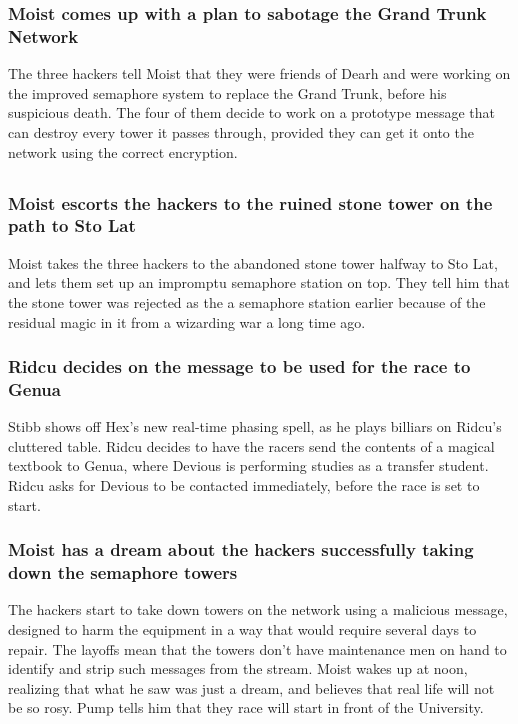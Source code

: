 \subsubsection{\Gls{Moist} comes up with a plan to sabotage the Grand Trunk Network}
The three hackers tell \Gls{Moist} that they were friends of \Gls{Dearh} and were working on the
improved semaphore system to replace the Grand Trunk, before his suspicious death. The four of them
decide to work on a prototype message that can destroy every tower it passes through, provided they
can get it onto the network using the correct encryption.

\subsection{}
\subsubsection{\Gls{Moist} escorts the hackers to the ruined stone tower on the path to Sto Lat}
\Gls{Moist} takes the three hackers to the abandoned stone tower halfway to Sto Lat, and lets them
set up an impromptu semaphore station on top. They tell him that the stone tower was rejected as
the a semaphore station earlier because of the residual magic in it from a wizarding war a long time
ago.

\subsubsection{\Gls{Ridcu} decides on the message to be used for the race to Genua}
\Gls{Stibb} shows off \Gls{Hex}'s new real-time phasing spell, as he plays billiars on \Gls{Ridcu}'s
cluttered table. \Gls{Ridcu} decides to have the racers send the contents of a magical textbook to
Genua, where \Gls{Devious} is performing studies as a transfer student. \Gls{Ridcu} asks for
\Gls{Devious} to be contacted immediately, before the race is set to start.

\subsubsection{\Gls{Moist} has a dream about the hackers successfully taking down the semaphore
    towers}
The hackers start to take down towers on the network using a malicious message, designed to harm the
equipment in a way that would require several days to repair. The layoffs mean that the towers
don't have maintenance men on hand to identify and strip such messages from the stream. \Gls{Moist}
wakes up at noon, realizing that what he saw was just a dream, and believes that real life will not
be so rosy. \Gls{Pump} tells him that they race will start in front of the University.

